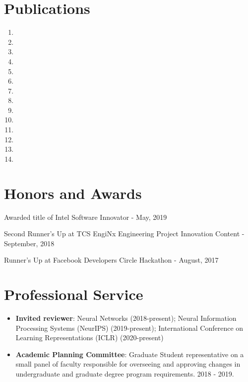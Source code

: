 \documentclass[a4paper,20pt]{article}
\begin{document}
\section{Publications}
\begin{enumerate}
    \item {}
    \item {}
    \item {}
    \item {}
    \item {}
    \item {}
    \item {}
    \item {}
    \item {}
    \item {}
    \item {}
    \item {}
    \item {}
    \item {}
\end{enumerate}

\section{Honors and Awards}
\begin{description}[font=$\bullet$]
\item {Awarded title of Intel Software Innovator - May, 2019}
\vspace{-5pt}
\item {Second Runner's Up at TCS EngiNx Engineering Project Innovation Content - September, 2018 }
\vspace{-5pt}
\item {Runner's Up at Facebook Developers Circle Hackathon - August, 2017}

\end{description}

\vspace{-5pt}
\section{Professional Service}
\begin{itemize}
    \item \textbf{Invited reviewer}: Neural Networks (2018-present); Neural Information Processing Systems (NeurIPS) (2019-present); International Conference on Learning Representations (ICLR) (2020-present)
    \item \textbf{Academic Planning Committee}: Graduate Student representative on a small panel of faculty responsible for overseeing and approving changes in undergraduate and graduate degree program requirements. 2018 - 2019.
\end{itemize}
\end{document}
